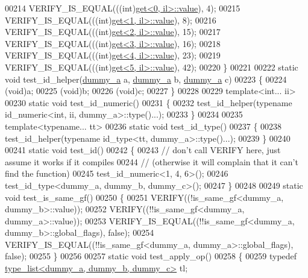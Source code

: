 \begin{DoxyCode}
00214   VERIFY\_IS\_EQUAL(((\textcolor{keywordtype}{int})\hyperlink{struct_eigen_1_1internal_1_1get}{get<0, il>::value}), 4);
00215   VERIFY\_IS\_EQUAL(((\textcolor{keywordtype}{int})\hyperlink{struct_eigen_1_1internal_1_1get}{get<1, il>::value}), 8);
00216   VERIFY\_IS\_EQUAL(((\textcolor{keywordtype}{int})\hyperlink{struct_eigen_1_1internal_1_1get}{get<2, il>::value}), 15);
00217   VERIFY\_IS\_EQUAL(((\textcolor{keywordtype}{int})\hyperlink{struct_eigen_1_1internal_1_1get}{get<3, il>::value}), 16);
00218   VERIFY\_IS\_EQUAL(((\textcolor{keywordtype}{int})\hyperlink{struct_eigen_1_1internal_1_1get}{get<4, il>::value}), 23);
00219   VERIFY\_IS\_EQUAL(((\textcolor{keywordtype}{int})\hyperlink{struct_eigen_1_1internal_1_1get}{get<5, il>::value}), 42);
00220 \}
00221 
00222 \textcolor{keyword}{static} \textcolor{keywordtype}{void} test\_id\_helper(\hyperlink{structdummy__a}{dummy\_a} a, \hyperlink{structdummy__a}{dummy\_a} b, \hyperlink{structdummy__a}{dummy\_a} c)
00223 \{
00224   (void)a;
00225   (void)b;
00226   (void)c;
00227 \}
00228 
00229 \textcolor{keyword}{template}<\textcolor{keywordtype}{int}... ii>
00230 \textcolor{keyword}{static} \textcolor{keywordtype}{void} test\_id\_numeric()
00231 \{
00232   test\_id\_helper(\textcolor{keyword}{typename} id\_numeric<int, ii, dummy\_a>::type()...);
00233 \}
00234 
00235 \textcolor{keyword}{template}<\textcolor{keyword}{typename}... tt>
00236 \textcolor{keyword}{static} \textcolor{keywordtype}{void} test\_id\_type()
00237 \{
00238   test\_id\_helper(\textcolor{keyword}{typename} id\_type<tt, dummy\_a>::type()...);
00239 \}
00240 
00241 \textcolor{keyword}{static} \textcolor{keywordtype}{void} test\_id()
00242 \{
00243   \textcolor{comment}{// don't call VERIFY here, just assume it works if it compiles}
00244   \textcolor{comment}{// (otherwise it will complain that it can't find the function)}
00245   test\_id\_numeric<1, 4, 6>();
00246   test\_id\_type<dummy\_a, dummy\_b, dummy\_c>();
00247 \}
00248 
00249 \textcolor{keyword}{static} \textcolor{keywordtype}{void} test\_is\_same\_gf()
00250 \{
00251   VERIFY((!is\_same\_gf<dummy\_a, dummy\_b>::value));
00252   VERIFY((!!is\_same\_gf<dummy\_a, dummy\_a>::value));
00253   VERIFY\_IS\_EQUAL((!!is\_same\_gf<dummy\_a, dummy\_b>::global\_flags), \textcolor{keyword}{false});
00254   VERIFY\_IS\_EQUAL((!!is\_same\_gf<dummy\_a, dummy\_a>::global\_flags), \textcolor{keyword}{false});
00255 \}
00256 
00257 \textcolor{keyword}{static} \textcolor{keywordtype}{void} test\_apply\_op()
00258 \{
00259   \textcolor{keyword}{typedef} \hyperlink{struct_eigen_1_1internal_1_1type__list}{type\_list<dummy\_a, dummy\_b, dummy\_c>} tl;

\end{DoxyCode}
